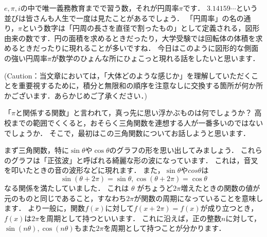 



$e, \pi , i$の中で唯一義務教育までで習う数，それが円周率$\pi$です．
$3.14159 \cdots$という並びは皆さんも人生で一度は見たことがあるでしょう．
「円周率」の名の通り，$\pi$という数字は「円周の長さを直径で割ったもの」として定義される，図形由来の数です．円の面積を求めるときだったり，大学受験では回転体の体積を求めるときだったりに現れることが多いですね．
今日はこのように図形的な側面の強い円周率$\pi$が数学のひょんな所にひょこっと現れる話をしたいと思います．

(Caution：当文章においては，「大体どのような感じか」を理解していただくことを重要視するために，積分と無限和の順序を注意なしに交換する箇所が何か所かございます．あらかじめご了承ください．)


「$\pi$と関係する関数」と言われて，真っ先に思い浮かぶものは何でしょうか？
高校までの範囲でくくると，おそらく三角関数を連想する人が一番多いのではないでしょうか．
そこで，最初はこの三角関数についてお話しようと思います．

まず三角関数，特に$\sin \theta$や$\cos \theta$のグラフの形を思い出してみましょう．
これらのグラフは「正弦波」と呼ばれる綺麗な形の波になっています．
これは，音叉を叩いたときの音の波形などに現れます．
また，$\sin \theta$や$cos \theta$は
\[
\sin ( \theta +2 \pi )= \sin \theta, \cos( \theta +2 \pi )= \cos \theta
\]
なる関係を満たしていました．
これは $\theta$ がちょうど$2 \pi$増えたときの関数の値が元のものと同じであること，すなわち$2 \pi$が関数の周期になっていることを意味します．
より一般に，関数$f(x)$に対して$f(x+2 \pi )=f(x)$が成り立つとき，$f(x)$は$2 \pi$を周期として持つといいます．
これに沿えば，正の整数$n$に対して，$\sin (n \theta ), \cos (n \theta)$もまた$2 \pi$を周期として持つことが分かります．


